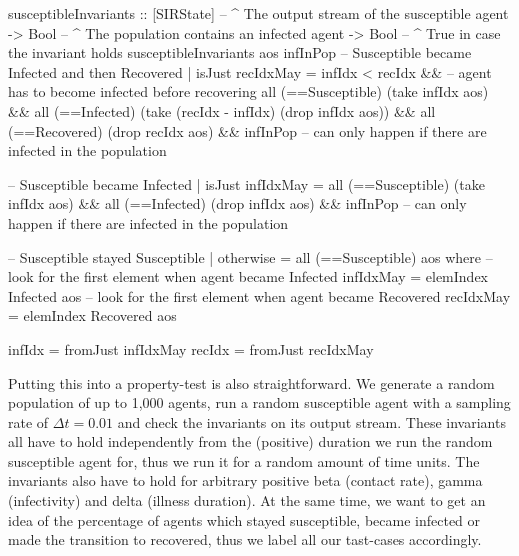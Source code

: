 \begin{HaskellCode}
susceptibleInvariants :: [SIRState] -- ^ The output stream of the susceptible agent 
                      -> Bool       -- ^ The population contains an infected agent
                      -> Bool       -- ^ True in case the invariant holds
susceptibleInvariants aos infInPop
    -- Susceptible became Infected and then Recovered
    | isJust recIdxMay 
      = infIdx < recIdx &&  -- agent has to become infected before recovering
        all (==Susceptible) (take infIdx aos) && 
        all (==Infected) (take (recIdx - infIdx) (drop infIdx aos)) && 
        all (==Recovered) (drop recIdx aos) &&
        infInPop  -- can only happen if there are infected in the population

    -- Susceptible became Infected
    | isJust infIdxMay 
      = all (==Susceptible) (take infIdx aos) &&
        all (==Infected) (drop infIdx aos) &&
        infInPop -- can only happen if there are infected in the population

    -- Susceptible stayed Susceptible
    | otherwise = all (==Susceptible) aos
  where
    -- look for the first element when agent became Infected
    infIdxMay = elemIndex Infected aos
    -- look for the first element when agent became Recovered
    recIdxMay = elemIndex Recovered aos

    infIdx = fromJust infIdxMay
    recIdx = fromJust recIdxMay
\end{HaskellCode}

Putting this into a property-test is also straightforward. We generate a random population of up to 1,000 agents, run a random susceptible agent with a sampling rate of $\Delta t = 0.01$ and check the invariants on its output stream. These invariants all have to hold independently from the (positive) duration we run the random susceptible agent for, thus we run it for a random amount of time units. The invariants also have to hold for arbitrary positive beta (contact rate), gamma (infectivity) and delta (illness duration). At the same time, we want to get an idea of the percentage of agents which stayed susceptible, became infected or made the transition to recovered, thus we label all our tast-cases accordingly.


